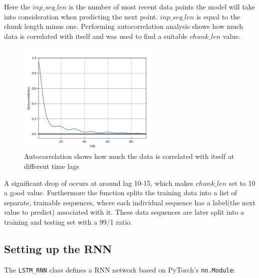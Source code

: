 \documentclass[11pt]{article}
\begin{document}
Here the $inp\_seq\_len$ is the number of most recent data points the model will take into consideration when predicting the next point. $inp\_seq\_len$ is equal to the chunk length minus one. Performing autocorrelation analysis shows how much data is correlated with itself and was used to find a suitable $chunk\_len$ value.
\begin{figure}[h]
\centering
\includegraphics[width=0.6\textwidth]{auto_correlation.png}
\caption{Autocorrelation shows how much the data is correlated with itself at different time lags}
\end{figure}

A significant drop of occurs at around lag 10-15, which  makes $chunk\_len$ set to 10 a good value. Furthermore the function splits the training data into a list of separate, trainable sequences, where each individual sequence has a label(the next value to predict) associated with it. These data sequences are later split into a training and testing set with a 99/1 ratio. 

\subsection{Setting up the RNN}

The \texttt{LSTM\_RNN} class defines a RNN network based on PyTorch's \texttt{nn.Module}:
\end{document}
